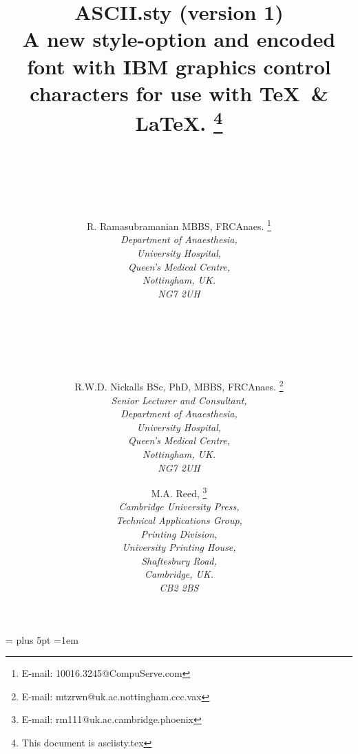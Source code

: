 \oddsidemargin=0mm
\evensidemargin=\oddsidemargin
\textwidth=160mm
\skip\footins=20pt plus 5pt
\parindent=1em
\pagestyle{myheadings}

\title{
       {{\bf ASCII.sty} {\small (version 1)}\\
        A new  style-option
       and encoded font with  IBM graphics control
characters for use with \TeX\ \& \LaTeX.}
       \thanks{This document is {\sc asciisty.tex}}
      }
\author{ \\
        \\
        \\
        \\
        \\
        R. Ramasubramanian {\small MBBS, FRCAnaes.}
        \thanks{E-mail: 10016.3245@CompuServe.com}\\
        {\small \it Department of Anaesthesia,} \\
        {\small \it University Hospital,} \\
        {\small \it Queen's Medical Centre,} \\
        {\small \it Nottingham, UK.}\\
        {\small \it NG7 2UH}\\
    \and \\
         \\
         \\
         \\
         \\
        R.W.D. Nickalls {\small BSc, PhD, MBBS, FRCAnaes.}
        \thanks{E-mail: mtzrwn@uk.ac.nottingham.ccc.vax}\\
        {\small \it Senior Lecturer and Consultant,}\\
        {\small \it Department of Anaesthesia,} \\
        {\small \it University Hospital,} \\
        {\small \it Queen's Medical Centre,} \\
        {\small \it Nottingham, UK.}\\
        {\small \it NG7 2UH}\\
     \and
        M.A. Reed,
       \thanks{E-mail: rm111@uk.ac.cambridge.phoenix }\\
        {\small \it Cambridge University Press,} \\
        {\small \it Technical Applications Group,} \\
        {\small \it Printing Division,} \\
        {\small \it University Printing House,} \\
        {\small \it Shaftesbury Road,} \\
        {\small \it Cambridge, UK.}\\
        {\small \it CB2 2BS} \\
        }
